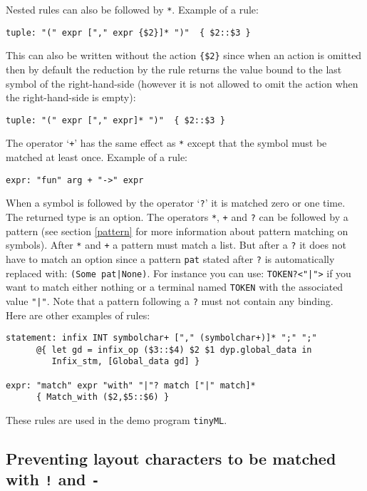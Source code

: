 \documentclass[12pt]{article}
\begin{document}
{Nested rules can also be followed by \verb|*|. Example of a rule:
\begin{verbatim}
tuple: "(" expr ["," expr {$2}]* ")"  { $2::$3 }
\end{verbatim}
This can also be written without the action \verb|{$2}| since when an action is omitted then by default the reduction by the rule returns the value bound to the last symbol of the right-hand-side (however it is not allowed to omit the action when the right-hand-side is empty):
\begin{verbatim}
tuple: "(" expr ["," expr]* ")"  { $2::$3 }
\end{verbatim}

The operator `\verb|+|' has the same effect as \verb|*| except that the symbol must be matched at least once. Example of a rule:
\begin{verbatim}
expr: "fun" arg + "->" expr
\end{verbatim}

When a symbol is followed by the operator `\verb|?|' it is matched zero or one time. The returned type is an option. The operators \verb|*|, \verb|+| and \verb|?| can be followed by a pattern (see section \ref{pattern} for more information about pattern matching on symbols). After \verb|*| and \verb|+| a pattern must match a list. But after a \verb|?| it does not have to match an option since a pattern \verb|pat| stated after \verb|?| is automatically replaced with: \verb:(Some pat|None):. For instance you can use: \verb:TOKEN?<"|">: if you want to match either nothing or a terminal named \verb|TOKEN| with the associated value \verb:"|":. Note that a pattern following a \verb|?| must not contain any binding.\\

Here are other examples of rules:
\begin{verbatim}
statement: infix INT symbolchar+ ["," (symbolchar+)]* ";" ";"
      @{ let gd = infix_op ($3::$4) $2 $1 dyp.global_data in
         Infix_stm, [Global_data gd] }

expr: "match" expr "with" "|"? match ["|" match]*
      { Match_with ($2,$5::$6) }
\end{verbatim}
These rules are used in the demo program \verb|tinyML|.

\subsection{Preventing layout characters to be matched with \texttt{!} and \texttt{-}}\label{bang}

}
\end{document}
